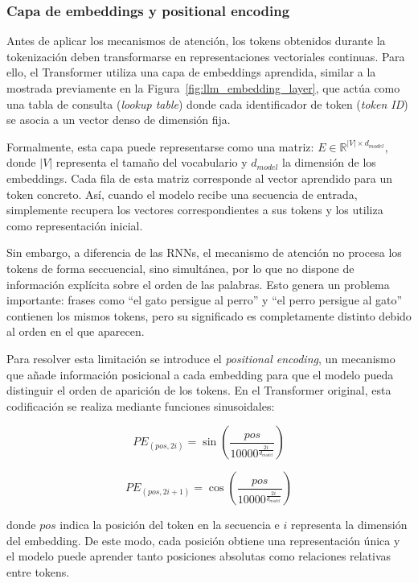 \subsubsection{Capa de embeddings y positional encoding}

Antes de aplicar los mecanismos de atención, los tokens obtenidos durante la tokenización deben transformarse en representaciones vectoriales continuas. Para ello, el Transformer utiliza una capa de embeddings aprendida, similar a la mostrada previamente en la Figura~\ref{fig:llm_embedding_layer}, que actúa como una tabla de consulta (\textit{lookup table}) donde cada identificador de token (\textit{token ID}) se asocia a un vector denso de dimensión fija.

Formalmente, esta capa puede representarse como una matriz: $E \in \mathbb{R}^{|V| \times d_{model}}$, donde $|V|$ representa el tamaño del vocabulario y $d_{model}$ la dimensión de los embeddings. Cada fila de esta matriz corresponde al vector aprendido para un token concreto. Así, cuando el modelo recibe una secuencia de entrada, simplemente recupera los vectores correspondientes a sus tokens y los utiliza como representación inicial.

Sin embargo, a diferencia de las \acp{RNN}, el mecanismo de atención no procesa los tokens de forma seccuencial, sino simultánea, por lo que no dispone de información explícita sobre el orden de las palabras. Esto genera un problema importante: frases como ``el gato persigue al perro'' y ``el perro persigue al gato'' contienen los mismos tokens, pero su significado es completamente distinto debido al orden en el que aparecen.

Para resolver esta limitación se introduce el \textit{positional encoding}, un mecanismo que añade información posicional a cada embedding para que el modelo pueda distinguir el orden de aparición de los tokens. En el Transformer original, esta codificación se realiza mediante funciones sinusoidales:

\begin{equation*}
	PE_{(pos,2i)} =
	\sin\left(
	\frac{pos}{10000^{\frac{2i}{d_{model}}}}
	\right)
\end{equation*}

\begin{equation*}
	PE_{(pos,2i+1)} =
	\cos\left(
	\frac{pos}{10000^{\frac{2i}{d_{model}}}}
	\right)
\end{equation*}

donde $pos$ indica la posición del token en la secuencia e $i$ representa la dimensión del embedding. De este modo, cada posición obtiene una representación única y el modelo puede aprender tanto posiciones absolutas como relaciones relativas entre tokens.

